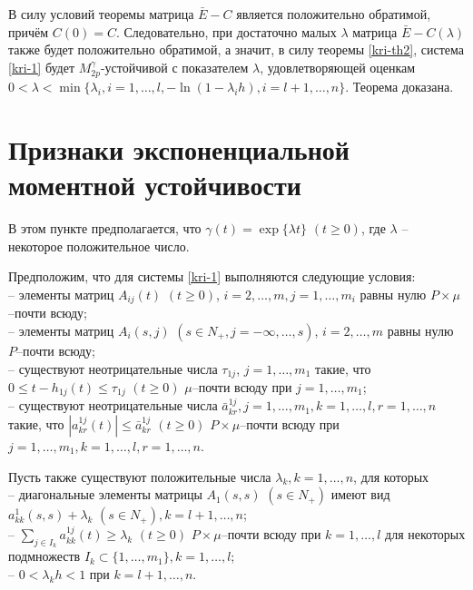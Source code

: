 В силу условий теоремы матрица $\bar E - C$ является положительно
обратимой, причём $C(0) = C$. Следовательно, при достаточно малых
$\lambda $ матрица $\bar E- C(\lambda )$ также будет положительно
обратимой, а значит, в силу теоремы \ref{kri-th2}, система \eqref{kri-1} будет
$M_{2p}^\gamma$-устойчивой с показателем $\lambda$, удовлетворяющей
оценкам $0<\lambda < \min \{\lambda _i, i = 1, \dots,l, -\ln
(1-\lambda _ih), i = l+1, \dots, n \}$. Теорема доказана.

\section{Признаки экспоненциальной моментной устойчивости}\label{kri-s4}
В этом пункте предполагается, что $\gamma (t) = \exp \{\lambda t\}
\,\, (t \geq 0)$, где $\lambda$ --  некоторое  положительное число.

Предположим, что для системы \eqref{kri-1} выполняются следующие условия:\\
\noindent
  -- элементы матриц
$A_{ij}(t) \,\, (t \geq 0)$, $i = 2,\dots,m, j = 1,\dots,m_i$ равны нулю
$P\times \mu$--почти всюду;\\
  -- элементы матриц $A_i(s,j)\,\, (s \in
N_+, j=-\infty,\dots,s)$, $i=2,\dots,m$  равны нулю $P$--почти всюду;\\
    --  существуют неотрицательные числа $\tau_{1j}$, $j = 1,\dots,m_1$ такие, что $0 \leq t- h_{1j}(t) \leq \tau _{1j} {\,} {\,} (t
\geq 0)$ $\mu $--почти всюду при $j = 1,\dots,m_1$;\\
  -- существуют неотрицательные числа $\bar a^{1j}_{kr}, j = 1,\dots,m_1, k =1,\dots,l, r = 1,\dots,n$
 такие, что $|a^{1j}_{kr}(t)|\leq \bar a^{1j}_{kr} \,\, (t\geq 0) $
$P\times\mu$--почти всюду при $j = 1,\dots,m_1, k =1,\dots,l, r =
1,\dots,n$.

Пусть также существуют положительные числа $\lambda _k, k = 1, \dots,
n$, для которых\\
\noindent
-- диагональные элементы
матрицы $ A_1(s,s)$ $(s \in N_+)$ имеют вид $a_{kk}^{1}(s,s) +
\lambda _k \,\, (s \in N_+), k=l + 1, \dots, n$;\\
--  $\sum \limits_{j\in I_k}a^{1j}_{kk}(t)
\geq \lambda _k \,\, (t\geq 0)$ $P\times\mu$--почти всюду при $k =
1,\dots,l$ для некоторых подмножеств $I_k \subset \{1,\dots, m_1\}, k =
1,\dots, l$;\\
-- $0 < \lambda _kh < 1$ при $ k
= l + 1, \dots, n$.

